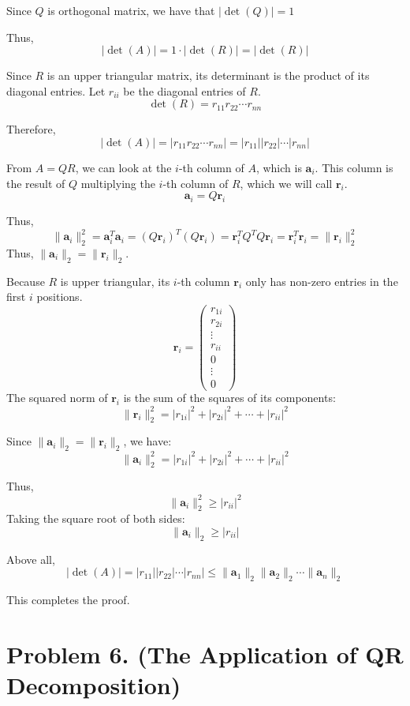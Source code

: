 \documentclass{article}
\newcommand{\0}{{\mathbf{0}}} %
\begin{document}
Since $Q$ is orthogonal matrix, we have that $|\det(Q)| = 1$

Thus,
$$
|\det(A)| = 1 \cdot |\det(R)| = |\det(R)|
$$

Since $R$ is an upper triangular matrix, its determinant is the product of its diagonal entries. Let $r_{ii}$ be the diagonal entries of $R$.
$$
\det(R) = r_{11} r_{22} \cdots r_{nn}
$$

Therefore,
$$
|\det(A)| = |r_{11} r_{22} \cdots r_{nn}| = |r_{11}| |r_{22}| \cdots |r_{nn}|
$$

From $A = QR$, we can look at the $i$-th column of $A$, which is $\mathbf{a}_i$. This column is the result of $Q$ multiplying the $i$-th column of $R$, which we will call $\mathbf{r}_i$.
$$
\mathbf{a}_i = Q \mathbf{r}_i
$$

Thus,
$$
\|\mathbf{a}_i\|_2^2 = \mathbf{a}_i^T \mathbf{a}_i = (Q \mathbf{r}_i)^T (Q \mathbf{r}_i) = \mathbf{r}_i^T Q^T Q \mathbf{r}_i = \mathbf{r}_i^T \mathbf{r}_i = \|\mathbf{r}_i\|_2^2
$$
Thus, $\|\mathbf{a}_i\|_2 = \|\mathbf{r}_i\|_2$.

Because $R$ is upper triangular, its $i$-th column $\mathbf{r}_i$ only has non-zero entries in the first $i$ positions.
$$
\mathbf{r}_i =
\begin{pmatrix} r_{1i} \\ r_{2i} \\ \vdots \\ r_{ii} \\ 0 \\ \vdots \\ 0
\end{pmatrix}
$$
The squared norm of $\mathbf{r}_i$ is the sum of the squares of its components:
$$
\|\mathbf{r
}_i\|_2^2 = |r_{1i}|^2 + |r_{2i}|^2 + \cdots + |r_{ii}|^2
$$

Since $\|\mathbf{a}_i\|_2 = \|\mathbf{r}_i\|_2$, we have:
$$
\|\mathbf{a}_i\|_2^2 = |r_{1i}|^2 + |r_{2i}|^2 + \cdots + |r_{ii}|^2
$$

Thus,
$$
\|\mathbf{a}_i\|_2^2 \ge |r_{ii}|^2
$$
Taking the square root of both sides:
$$
\|\mathbf{a}_i\|_2 \ge |r_{ii}|
$$

Above all,
$$
|\det(A)| = |r_{11}| |r_{22}| \cdots |r_{nn}| \le \|\mathbf{a}_1\|_2 \|\mathbf{a}_2\|_2 \cdots \|\mathbf{a}_n\|_2
$$

This completes the proof.

\section*{Problem 6. (The Application of QR Decomposition)}
\end{document}
